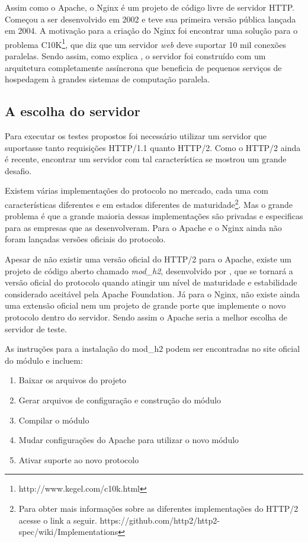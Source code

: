 Assim como o Apache, o Nginx é um projeto de código livre de servidor HTTP. Começou a ser desenvolvido em 2002 e teve sua primeira versão pública lançada em 2004. A motivação para a criação do Nginx foi encontrar uma solução para o problema C10K\footnote{http://www.kegel.com/c10k.html}, que diz que um servidor \textit{web} deve suportar 10 mil conexões paralelas. Sendo assim, como explica , o servidor foi construído com um arquitetura completamente assíncrona que beneficia de pequenos serviços de hospedagem à grandes sistemas de computação paralela.

\subsection{A escolha do servidor}
\label{aescolhadoservidor}

Para executar os testes propostos foi necessário utilizar um servidor que suportasse tanto requisições HTTP/1.1 quanto HTTP/2. Como o HTTP/2 ainda é recente, encontrar um servidor com tal característica se mostrou um grande desafio.

Existem várias implementações do protocolo no mercado, cada uma com características diferentes e em estados diferentes de maturidade\footnote{Para obter mais informações sobre as diferentes implementações do HTTP/2 acesse o link a seguir. https://github.com/http2/http2-spec/wiki/Implementations}. Mas o grande problema é que a grande maioria dessas implementações são privadas e especificas para as empresas que as desenvolveram. Para o Apache e o Nginx ainda não foram lançadas versões oficiais do protocolo.

Apesar de não existir uma versão oficial do HTTP/2 para o Apache, existe um projeto de código aberto chamado \textit{mod\_h2}, desenvolvido por , que se tornará a versão oficial do protocolo quando atingir um nível de maturidade e estabilidade considerado aceitável pela Apache Foundation. Já para o Nginx, não existe ainda uma extensão oficial nem um projeto de grande porte que implemente o novo protocolo dentro do servidor. Sendo assim o Apache seria a melhor escolha de servidor de teste.

As instruções para a instalação do mod\_h2 podem ser encontradas no site oficial do módulo e incluem:
\begin{enumerate}
	\item Baixar os arquivos do projeto
	\item Gerar arquivos de configuração e construção do módulo
	\item Compilar o módulo
	\item Mudar configurações do Apache para utilizar o novo módulo
	\item Ativar suporte ao novo protocolo
\end{enumerate}

